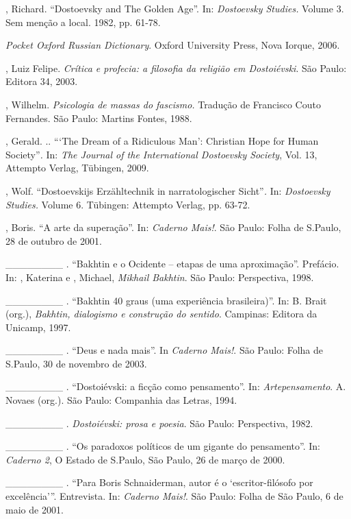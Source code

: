 \begin{Parskip}
, Richard. ``Dostoevsky and The Golden Age''. In: \emph{Dostoevsky
Studies.} Volume 3. Sem menção a local. 1982, pp. 61-78.

\emph{Pocket Oxford Russian Dictionary}. Oxford University Press, Nova
Iorque, 2006.

, Luiz Felipe. \emph{Crítica e profecia: a filosofia da religião em
Dostoiévski}. São Paulo: Editora 34, 2003.

, Wilhelm. \emph{Psicologia de massas do fascismo.} Tradução de
Francisco Couto Fernandes. São Paulo: Martins Fontes, 1988.

, Gerald. .. ```The Dream of a Ridiculous Man': Christian Hope for
Human Society''\emph{.} In: \emph{The Journal of the International
Dostoevsky Society}, Vol. 13, Attempto Verlag, Tübingen, 2009.

, Wolf. ``Dostoevskijs Erzähltechnik in narratologischer
Sicht''\emph{.} In: \emph{Dostoevsky Studies.} Volume 6. Tübingen:
Attempto Verlag, pp. 63-72.

, Boris. ``A arte da superação''. In: \emph{Caderno Mais!}.
São Paulo: Folha de S.Paulo, 28 de outubro de 2001.

\_\_\_\_\_\_\_\_ . ``Bakhtin e o Ocidente -- etapas de uma
aproximação''. Prefácio. In: , Katerina e , Michael,
\emph{Mikhail Bakhtin}. São Paulo: Perspectiva, 1998.

\_\_\_\_\_\_\_\_ . ``Bakhtin 40 graus (uma experiência brasileira)''.
In: B. Brait (org.), \emph{Bakhtin, dialogismo e construção do sentido}.
Campinas: Editora da Unicamp, 1997.

\_\_\_\_\_\_\_\_ . ``Deus e nada mais''. In \emph{Caderno Mais!}. São
Paulo: Folha de S.Paulo, 30 de novembro de 2003.

\_\_\_\_\_\_\_\_ . ``Dostoiévski: a ficção como pensamento''. In:
\emph{Artepensamento}. A. Novaes (org.). São Paulo: Companhia das
Letras, 1994.

\_\_\_\_\_\_\_\_ . \emph{Dostoiévski: prosa e poesia}. São Paulo:
Perspectiva, 1982.

\_\_\_\_\_\_\_\_ . ``Os paradoxos políticos de um gigante do
pensamento''. In: \emph{Caderno 2}, O Estado de S.Paulo, São Paulo, 26
de março de 2000.

\_\_\_\_\_\_\_\_ . ``Para Boris Schnaiderman, autor é o
`escritor-filósofo por excelência'''. Entrevista. In: \emph{Caderno
Mais!}. São Paulo: Folha de São Paulo, 6 de maio de 2001.


\end{Parskip}
